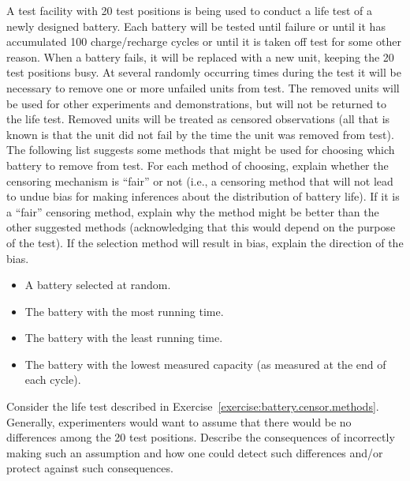 \begin{exercise}
\label{exercise:battery.censor.methods}
A test facility with 20 test positions is being used to conduct a life
test of a newly designed battery.  Each battery will be tested until
failure or until it has accumulated 100 charge/recharge cycles or
until it is taken off test for some other reason.  When a battery
fails, it will be replaced with a new unit, keeping the 20 test
positions busy. At several randomly occurring  
times during the test it will be necessary
to remove one or more unfailed units from test. The removed units will
be used for other experiments and demonstrations, but will not be
returned to the life test. Removed units will be treated as censored
observations (all that is known is that the unit did not fail
by the time the unit was removed from test). The following list
suggests some methods that might be used for choosing which battery to
remove from test.  For each method of choosing, explain whether the
censoring mechanism is ``fair'' or not (i.e., a censoring method that
will not lead to undue bias for making inferences about the
distribution of battery life). If it is a ``fair'' censoring method,
explain why the method might be better than the other suggested
methods (acknowledging that this would depend on the purpose of the
test). If the selection method will result in bias, explain the 
direction of the bias.
\begin{itemize}
\item
A battery selected at random.
\item
The battery with the most running time.
\item
The battery with the least running time.
\item
The battery with the lowest measured capacity (as measured
at the end of each cycle).
\end{itemize}
\end{exercise}

\begin{exercise}
Consider the life test described in
Exercise~\ref{exercise:battery.censor.methods}.
Generally, experimenters would want to
assume that there would be no differences
among the 20 test positions. Describe the consequences of 
incorrectly making such
an assumption and how one could detect such differences
and/or protect against such consequences.
\end{exercise}

